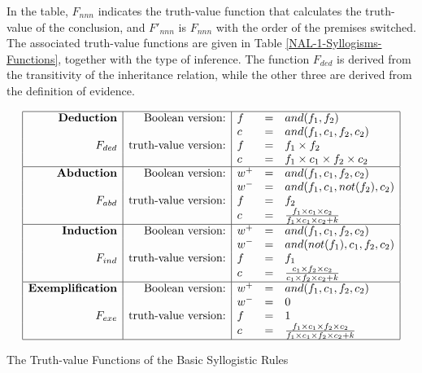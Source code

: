 In the table, $F_{nnn}$ indicates the truth-value function that calculates the truth-value of the conclusion, and $F'_{nnn}$ is $F_{nnn}$ with the order of the premises switched. The associated truth-value functions are given in Table \ref{NAL-1-Syllogisms-Functions}, together with the type of inference. The function $F_{ded}$ is derived from the transitivity of the inheritance relation, while the other three are derived from the definition of evidence. 
\begin{table}[htb]
\[\begin{array}{|r|r|lcl|} \hline
\mbox{\textbf{Deduction}} & \mbox{Boolean version:}     & f & = & and(f_1, f_2) \\
								 &					                   & c & = & and(f_1, c_1, f_2, c_2) \\
         F_{ded} & \mbox{truth-value version:} & f & = & f_1 \times f_2 \\
								 &				                     & c & = & f_1 \times c_1 \times f_2 \times c_2 \\
\hline
\mbox{\textbf{Abduction}} & \mbox{Boolean version:}   & w^+ & = & and(f_1, c_1, f_2, c_2) \\
								 &					                          & w^- & = & and(f_1, c_1, not(f_2), c_2) \\
         F_{abd} & \mbox{truth-value version:} & f & = & f_2 \\
								 &					                   & c & = & \frac{f_1 \times c_1 \times c_2}{f_1 \times c_1 \times c_2 + k}\\
\hline
\mbox{\textbf{Induction}} & \mbox{Boolean version:}   & w^+ & = & and(f_1, c_1, f_2, c_2) \\
								 &					                          & w^- & = & and(not(f_1), c_1, f_2, c_2) \\
         F_{ind} & \mbox{truth-value version:} & f & = & f_1 \\
								 &					                   & c & = & \frac{c_1 \times f_2 \times c_2}{c_1 \times f_2 \times c_2 + k}\\
\hline
\mbox{\textbf{Exemplification}} & \mbox{Boolean version:}   & w^+ & = & and(f_1, c_1, f_2, c_2) \\
								 &					                                & w^- & = & 0 \\
         F_{exe} & \mbox{truth-value version:} & f & = & 1 \\
								 &					                   & c & = & \frac{f_1 \times c_1 \times f_2 \times c_2}{f_1 \times c_1 \times f_2 \times c_2 + k}\\
\hline \end{array}\]
\caption{The Truth-value Functions of the Basic Syllogistic Rules}
\label{NAL-1-Syllogisms-Functions}
\end{table}


